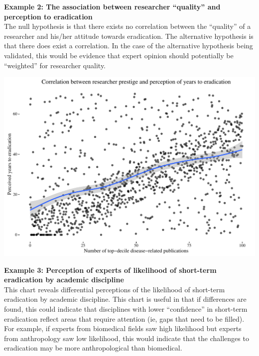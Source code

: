\documentclass{article}
\begin{document}
\newpage
\noindent \textbf{Example 2: The association between researcher “quality” and perception to eradication} \\
\noindent The null hypothesis is that there exists no correlation between the “quality” of a researcher and his/her attitude towards eradication. The alternative hypothesis is that there does exist a correlation. In the case of the alternative hypothesis being validated, this would be evidence that expert opinion should potentially be “weighted” for researcher quality. 

\begin{center}
\includegraphics{chart2.pdf}
\end{center}

\newpage
\noindent \textbf{Example 3: Perception of experts of likelihood of short-term eradication by academic discipline} \\
\noindent This chart reveals differential perceptions of the likelihood of short-term eradication by academic discipline. This chart is useful in that if differences are found, this could indicate that disciplines with lower “confidence” in short-term eradication reflect areas that require attention (ie, gaps that need to be filled). For example, if experts from biomedical fields saw high likelihood but experts from anthropology saw low likelihood, this would indicate that the challenges to eradication may be more anthropological than biomedical.
\end{document}
